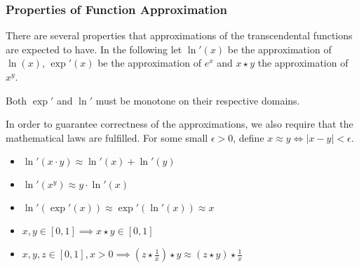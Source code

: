 \subsubsection{Properties of Function Approximation}
\label{sec:prop-funct-appr-1}

There are several properties that approximations of the transcendental functions
are expected to have. In the following let $\ln'(x)$ be the approximation of
$\ln(x)$, $\exp'(x)$ be the approximation of $e^{x}$ and $x\star y$ the approximation
of $x^{y}$.

\begin{property}
  \label{prop:monotone}
  Both $\exp'$ and $\ln'$ must be monotone on their respective domains.
\end{property}

In order to guarantee correctness of the approximations, we also require that
the mathematical laws are fulfilled. For some small $\epsilon > 0$, define
$x \approx y \Leftrightarrow \lvert x - y\rvert < \epsilon$.

\begin{property}
  \label{prop:ln-laws}
  \begin{itemize}
  \item $\ln'(x\cdot y) \approx \ln'(x) + \ln'(y)$
  \item $\ln'(x^{y}) \approx y\cdot \ln'(x)$
  \item $\ln'(\exp'(x)) \approx \exp'(\ln'(x)) \approx x$
  \item $x, y \in [0,1] \implies x \star y \in [0, 1]$
  \item $x, y, z \in [0,1], x > 0 \implies
    (z\star\frac{1}{x})\star y \approx (z\star y)\star\frac{1}{x}$
  \end{itemize}
\end{property}


